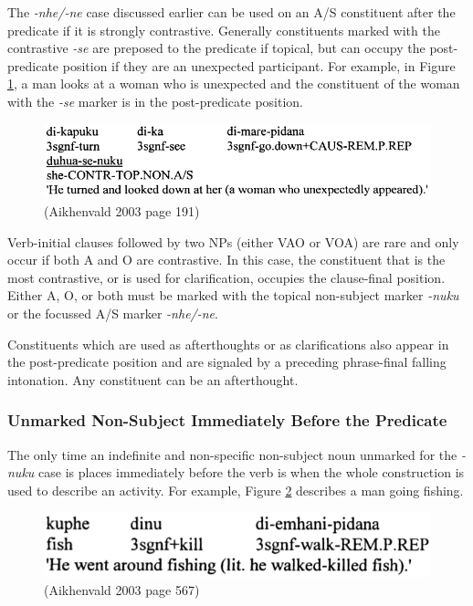\documentclass{article}
\begin{document}
The \textit{-nhe/-ne} case discussed earlier can be used on an A/S constituent after the predicate if it is strongly contrastive. Generally constituents marked with the contrastive \textit{-se} are preposed to the predicate if topical, but can occupy the post-predicate position if they are an unexpected participant. For example, in Figure \ref*{unexpectedwoman}, a man looks at a woman who is unexpected and the constituent of the woman with the \textit{-se} marker is in the post-predicate position.

\begin{figure}[h!]
  \centering
  \includegraphics[scale = 0.43]{unexpectedwoman.png}
    \caption{(Aikhenvald 2003 page 191)}
    \label{unexpectedwoman}
\end{figure}

Verb-initial clauses followed by two NPs (either VAO or VOA) are rare and only occur if both A and O are contrastive. In this case, the constituent that is the most contrastive, or is used for clarification, occupies the clause-final position. Either A, O, or both must be marked with the topical non-subject marker \textit{-nuku} or the focussed A/S marker \textit{-nhe/-ne}.

Constituents which are used as afterthoughts or as clarifications also appear in the post-predicate position and are signaled by a preceding phrase-final falling intonation. Any constituent can be an afterthought.

\subsubsection{Unmarked Non-Subject Immediately Before the Predicate}
The only time an indefinite and non-specific non-subject noun unmarked for the \textit{-nuku} case is places immediately before the verb is when the whole construction is used to describe an activity. For example, Figure \ref*{fishing} describes a man going fishing.

\begin{figure}[h!]
  \centering
  \includegraphics[scale = 0.4]{fishing.png}
    \caption{(Aikhenvald 2003 page 567)}
    \label{fishing}
\end{figure}
\end{document}
